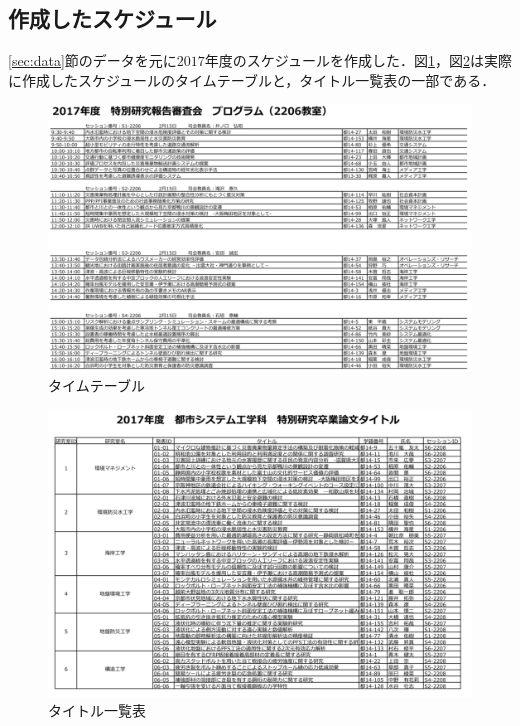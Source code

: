 \documentclass[a4paper,12pt,fleqn]{jarticle}
\begin{document}
\subsection{作成したスケジュール}
\ref{sec:data}節のデータを元に$2017$年度のスケジュールを作成した．図\ref{fig:timeo}，図\ref{fig:titleo}は実際に作成したスケジュールのタイムテーブルと，タイトル一覧表の一部である．
\begin{figure}[H]
  \begin{center}
    \includegraphics[scale=0.7]{tiomeo.png}
    \caption{タイムテーブル}
    \label{fig:timeo}
  \end{center}
\end{figure}

\begin{figure}[H]
  \begin{center}
    \includegraphics[scale=0.7]{titleo.png}
    \caption{タイトル一覧表}
    \label{fig:titleo}
  \end{center}
\end{figure}
\end{document}
